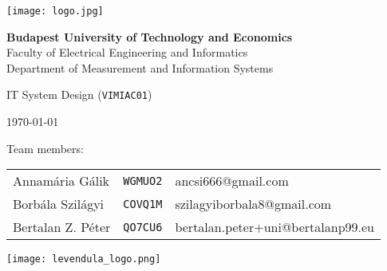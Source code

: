 \begin{titlepage}
	\begin{center}
		\texttt{[image: logo.jpg]}

		\vspace{.2cm}

		\textbf{Budapest University of Technology and Economics} \\
		Faculty of Electrical Engineering and Informatics \\
		Department of Measurement and Information Systems \\

		\vspace{2cm}

		{\huge IT System Design (\texttt{VIMIAC01})}

		\vspace{2cm}

		{\huge \bfseries \thetitle}

		\vspace{.5cm}

		{\Large \theauthor}

		\vspace{.5cm}

		{\Large \today}
	\end{center}

	\vfill{}

	{\large Team members:}

	\vspace{.25cm}

	\begin{minipage}{.7\textwidth}
		\begin{tabular}{lll}
			Annamária Gálik &
				\texttt{WGMUO2} &
				ancsi666@gmail.com \\
			Borbála Szilágyi &
				\texttt{COVQ1M} &
				szilagyiborbala8@gmail.com \\
			Bertalan Z. Péter &
				\texttt{QO7CU6} &
				bertalan.peter+uni@bertalanp99.eu
		\end{tabular}
	\end{minipage}
	\begin{minipage}{.1\textwidth}
		\begin{flushright}
			\texttt{[image: levendula\_logo.png]}
		\end{flushright}
	\end{minipage}


	\vspace{2cm}
\end{titlepage}
